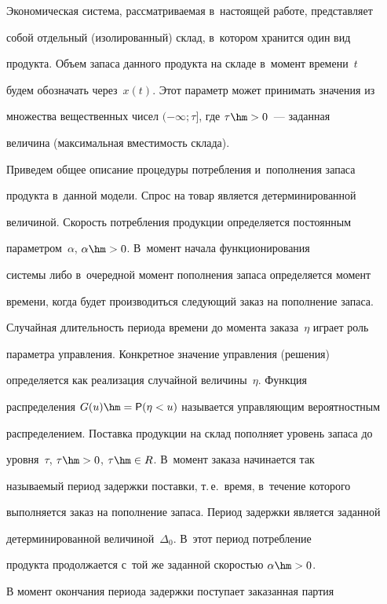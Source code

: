   Экономическая система, рассматриваемая в~настоящей работе, представляет 

собой отдельный (изолированный) склад, в~котором хранится один вид 

продукта. Объем запаса данного продукта на складе в~момент времени~$t$ 

будем обозначать через~$x(t)$. Этот параметр может принимать значения из 

множества вещественных чисел $(-\infty;\tau]$, где $\tau\hm>0$~--- заданная 

величина (максимальная вместимость склада). 

  

  Приведем общее описание процедуры потребления и~пополнения запаса 

продукта в~данной модели. Спрос на товар является детерминированной 

величиной. Скорость потребления продукции определяется постоянным 

параметром~$\alpha$, $\alpha\hm>0$. В~момент начала функционирования 

системы либо в~очередной момент пополнения запаса определяется момент 

времени, когда будет производиться следующий заказ на пополнение запаса. 

Случайная длительность периода времени до момента заказа~$\eta$ играет роль 

параметра управления. Конкретное значение управления (решения) 

определяется как реализация случайной величины~$\eta$. Функция 

распределения $G(u)\hm={\sf P}(\eta<u)$ называется управляющим вероятностным 

распределением. Поставка продукции на склад пополняет уровень запаса до 

уровня~$\tau$, $\tau\hm>0$, $\tau\hm\in R$. В~момент заказа начинается так 

называемый период задержки поставки, т.\,е.\ время, в~течение которого 

выполняется заказ на пополнение запаса. Период задержки является заданной 

детерминированной величиной~$\Delta_0$. В~этот период потребление 

продукта продолжается с~той же заданной скоростью $\alpha\hm>0$. 

  

  В момент окончания периода задержки поступает заказанная партия 


